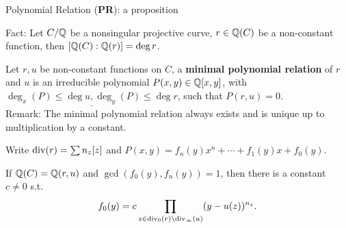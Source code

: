 \documentclass[handout]{beamer}
\begin{document}
\begin{frame}{Polynomial Relation ({\bf PR}): a proposition}

Fact: Let $C/\mathbb{Q}$ be a nonsingular projective curve, $r \in \mathbb{Q}(C)$ be a non-constant function, then $[\mathbb{Q}(C): \mathbb{Q}(r)] = \deg r$.

\pause 

\smallskip


Let $r, u$ be non-constant functions on $C$, a {\bf minimal polynomial relation} of $r$ and $u$ is an irreducible polynomial $P(x,y) \in \mathbb{Q}[x,y]$, with \hyperlink{proof: minimal pr}{$\underline{\deg_x(P) \leq \deg u, \deg_y(P) \leq \deg r}$}, such that $P(r,u) = 0$.  \\

\pause 
\smallskip
Remark: The minimal polynomial relation always exists and is unique up to multiplication by a constant.

\pause 

\hypertarget{pr: prelim}{}

Write $\operatorname{div}(r) =  \sum n_z[z]$ and $P(x,y) = f_n(y)x^n + \cdots + f_1(y)x + f_0(y)$. 


\begin{Prop}[C.]
\label{mult}
If $\mathbb{Q}(C) = \mathbb{Q}(r,u)$ and $\gcd(f_0(y), f_n(y)) = 1$, then there is a constant $c \neq 0$ s.t.
\[
		f_0(y) = c \prod_{z \in\operatorname{div}_{0}(r) \setminus \operatorname{div}_{\infty}(u)} (y - u(z))^{n_z}.
\]
\end{Prop}


\end{frame}
\end{document}
